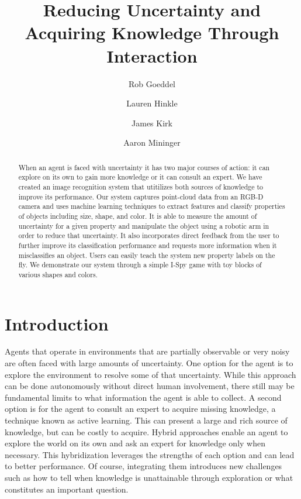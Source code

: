 \documentclass[11pt]{article}
\title{Reducing Uncertainty and Acquiring Knowledge Through Interaction}
\author{Rob Goeddel \and Lauren Hinkle \and James Kirk \and Aaron Mininger}
\date{}
\newcommand{\xxx}[1]{{\bf \color{red} #1}}
\begin{document}
\maketitle


\begin{abstract}
When an agent is faced with uncertainty it has two major courses of action: it can explore on its own to gain more knowledge or it can consult an expert. We have created an image recognition system that utitilizes both sources of knowledge to improve its performance. Our system captures point-cloud data from an RGB-D camera and uses machine learning techniques to extract features and classify properties of objects including size, shape, and color. It is able to measure the amount of uncertainty for a given property and manipulate the object using a robotic arm in order to reduce that uncertainty. It also incorporates direct feedback from the user to further improve its classification performance and requests more information when it misclassifies an object. Users can easily teach the system new property labels on the fly. We demonstrate our system through a simple I-Spy game with toy blocks of various shapes and colors.
\end{abstract}


\section{Introduction}
Agents that operate in environments that are partially observable or very
noisy are often faced with large amounts of uncertainty. One option for the
agent is to explore the environment to resolve some of that uncertainty. While
this approach can be done autonomously without direct human involvement, there
still may be fundamental limits to what information the agent is able to
collect. A second option is for the agent to consult an expert to acquire
missing knowledge, a technique known as active learning. This can present a
large and rich source of knowledge, but can be costly to acquire. Hybrid
approaches enable an agent to explore the world on its own and ask an expert
for knowledge only when necessary. This hybridization leverages the
strengths of each option and can lead to better performance. Of course,
          integrating them introduces new challenges such as how to tell when
          knowledge is unattainable through exploration or what constitutes an
          important question.
\end{document}
